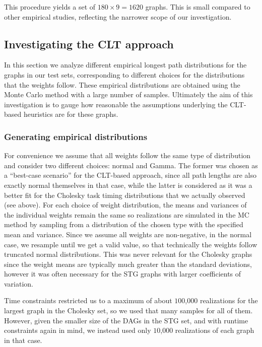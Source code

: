 \documentclass[12pt]{article}
\begin{document}
  This procedure yields a set of $180 \times 9 = 1620$ graphs. This is small compared to other empirical studies, reflecting the narrower scope of our investigation.

\subsection{Investigating the CLT approach}
\label{subsect.empirical_distribution}

In this section we analyze different empirical longest path distributions for the graphs in our test sets, corresponding to different choices for the distributions that the weights follow. These empirical distributions are obtained using the Monte Carlo method with a large number of samples. Ultimately the aim of this investigation is to gauge how reasonable the assumptions underlying the CLT-based heuristics are for these graphs.   

\subsubsection{Generating empirical distributions}
\label{subsubsect.generating}

For convenience we assume that all weights follow the same type of distribution and consider two different choices: normal and Gamma. The former was chosen as a ``best-case scenario'' for the CLT-based approach, since all path lengths are also exactly normal themselves in that case, while the latter is considered as it was a better fit for the Cholesky task timing distributions that we actually observed (see above). For each choice of weight distribution, the means and variances of the individual weights remain the same so realizations are simulated in the MC method by sampling from a distribution of the chosen type with the specified mean and variance. Since we assume all weights are non-negative, in the normal case, we resample until we get a valid value, so that technically the weights follow truncated normal distributions. This was never relevant for the Cholesky graphs since the weight means are typically much greater than the standard deviations, however it was often necessary for the STG graphs with larger coefficients of variation.     

Time constraints restricted us to a maximum of about $100$,$000$ realizations for the largest graph in the Cholesky set, so we used that many samples for all of them. However, given the smaller size of the DAGs in the STG set, and with runtime constraints again in mind, we instead used only $10$,$000$ realizations of each graph in that case.
\end{document}
